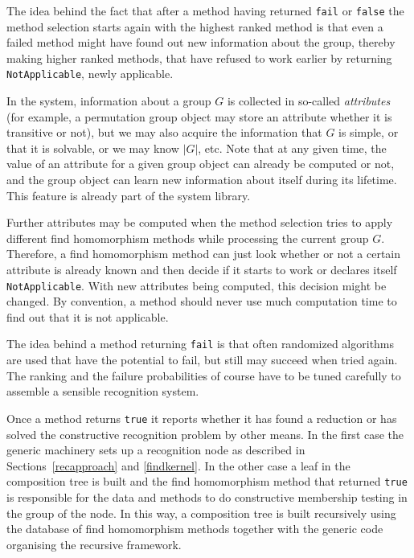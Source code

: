 The idea behind the fact that after a method having returned
\texttt{fail} or \texttt{false} the method selection starts again
with the highest ranked method is that even a failed method might
have found out new information about the group, thereby making
higher ranked methods, that have refused to work earlier by
returning \texttt{NotApplicable}, newly applicable.

In the {\GAP} system, information about a group $G$ is collected in
so-called {\em attributes} (for example,
a permutation group object may store an attribute whether it is transitive
or not), but we may also acquire the information that 
$G$ is simple, or that it is solvable, or we may know $|G|$, etc. 
Note that at any given time, the value of an attribute for a given group
object can already be computed or not, and the group object can learn new
information about itself during its lifetime. This feature is already
part of the {\GAP} system library. 

Further attributes may be
computed when the method selection tries to apply
different find homomorphism methods while processing the current group $G$.
Therefore, a find homomorphism method can just look whether or not
a certain attribute is already known and then decide if it starts
to work or declares itself \texttt{NotApplicable}. With new attributes
being computed, this decision might be changed. By convention, a method
should never use much computation time to find out that it is not
applicable.

The idea behind a method returning \texttt{fail} is that often
randomized algorithms are used that have the potential to fail,
but still may succeed when tried again. The ranking and the failure 
probabilities of course have to be tuned carefully to assemble
a sensible recognition system.

Once a method returns \texttt{true} it reports whether it has found a
reduction or has solved the constructive recognition problem by other
means. In the first case the generic machinery sets up a recognition node
as described in Sections~\ref{recapproach} and \ref{findkernel}. In the
other case a leaf in the composition tree is built and the find
homomorphism method that returned \texttt{true} is responsible for the
data and methods to do constructive membership testing in the group 
of the node. In this way, a composition tree is built recursively using the
database of find homomorphism methods together with the generic code
organising the recursive framework.

